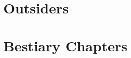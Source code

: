 \documentclass[a4paper,openany]{book}
\begin{document}
\chapter{Outsiders}

\begin{multicols}{2}

\archmage

\archmage

\dragon

\rockman

\lavaman

\end{multicols}

\chapter{Bestiary Chapters}
\end{document}
